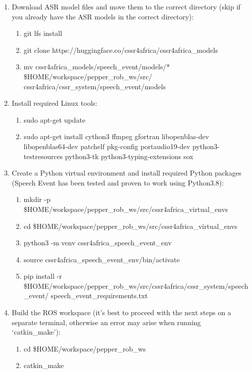 \documentclass{CSSRforAfrica}
\begin{document}
\begin{enumerate}
    \item Download ASR model files and move them to the correct directory (skip if you already have the ASR models in the correct directory):
    \begin{enumerate}
        \item git lfs install
        \item git clone https://huggingface.co/cssr4africa/cssr4africa\_models
        \item mv cssr4africa\_models/speech\_event/models/* \$HOME/workspace/pepper\_rob\_ws/src/\\cssr4africa/cssr\_system/speech\_event/models
    \end{enumerate}
    \item Install required Linux tools:
    \begin{enumerate}
        \item sudo apt-get update
        \item sudo apt-get install cython3 ffmpeg gfortran libopenblas-dev libopenblas64-dev patchelf pkg-config portaudio19-dev python3-testresources python3-tk python3-typing-extensions sox
    \end{enumerate}
    \item Create a Python virtual environment and install required Python packages (Speech Event has been tested and proven to work using Python3.8): 
    \begin{enumerate}
        \item mkdir -p \$HOME/workspace/pepper\_rob\_ws/src/cssr4africa\_virtual\_envs
        \item cd \$HOME/workspace/pepper\_rob\_ws/src/cssr4africa\_virtual\_envs
        \item python3 -m venv cssr4africa\_speech\_event\_env
        \item source cssr4africa\_speech\_event\_env/bin/activate
        \item pip install -r \$HOME/workspace/pepper\_rob\_ws/src/cssr4africa/cssr\_system/speech\_event/ speech\_event\_requirements.txt
    \end{enumerate}
    \item Build the ROS workspace (it's best to proceed with the next steps on a separate terminal, otherwise an error may arise when running `catkin\_make'):
    \begin{enumerate}
        \item cd \$HOME/workspace/pepper\_rob\_ws
        \item catkin\_make

\end{enumerate}
\end{enumerate}
\end{document}
